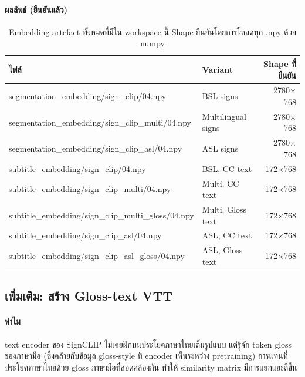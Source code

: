 \documentclass[11pt,a4paper]{article}
\def\texttt#1{#1}%
\def\textbf#1{#1}%
\begin{document}
\paragraph{ผลลัพธ์ (ยืนยันแล้ว)}

\begin{table}[h]
\centering
\small
\begin{tabularx}{\linewidth}{lXr}
\toprule
\textbf{ไฟล์} & \textbf{Variant} & \textbf{Shape ที่ยืนยัน} \\
\midrule
\texttt{segmentation\_embedding/sign\_clip/04.npy}            & BSL signs           & 2780$\times$768 \\
\texttt{segmentation\_embedding/sign\_clip\_multi/04.npy}     & Multilingual signs  & 2780$\times$768 \\
\texttt{segmentation\_embedding/sign\_clip\_asl/04.npy}       & ASL signs           & 2780$\times$768 \\
\texttt{subtitle\_embedding/sign\_clip/04.npy}                & BSL, CC text        & 172$\times$768  \\
\texttt{subtitle\_embedding/sign\_clip\_multi/04.npy}         & Multi, CC text      & 172$\times$768  \\
\texttt{subtitle\_embedding/sign\_clip\_multi\_gloss/04.npy}  & Multi, Gloss text   & 172$\times$768  \\
\texttt{subtitle\_embedding/sign\_clip\_asl/04.npy}           & ASL, CC text        & 172$\times$768  \\
\texttt{subtitle\_embedding/sign\_clip\_asl\_gloss/04.npy}    & ASL, Gloss text     & 172$\times$768  \\
\bottomrule
\end{tabularx}
\caption{Embedding artefact ทั้งหมดที่มีใน workspace นี้ Shape ยืนยันโดยการโหลดทุก \texttt{.npy} ด้วย numpy}
\label{tab:embeddings}
\end{table}


\subsection{เพิ่มเติม: สร้าง Gloss-text VTT}
\label{sec:gloss-vtt}

\paragraph{ทำไม}
text encoder ของ SignCLIP ไม่เคยฝึกบนประโยคภาษาไทยเต็มรูปแบบ
แต่รู้จัก token gloss ของภาษามือ (ซึ่งคล้ายกับข้อมูล gloss-style
ที่ encoder เห็นระหว่าง pretraining)
การแทนที่ประโยคภาษาไทยด้วย gloss ภาษามือที่สอดคล้องกัน
ทำให้ similarity matrix มีการแยกแยะดีขึ้น
\end{document}
